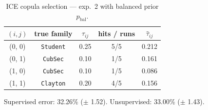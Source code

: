 \begin{table}[htbp]
  \centering
  \caption{ICE copula selection — exp.\ 2 with balanced prior $p_{\text{bal}}$.}
  \label{tab:exp3-exp2_bal_p}
  \begin{tabular}{ccccc}
    \toprule
    $(i, j)$ & true family & $\tau_{ij}$ & hits / runs & $\hat\tau_{ij}$ \\
    \midrule
    (0, 0) & \texttt{Student} & 0.25 & 5/5 & 0.212 \\
    (0, 1) & \texttt{CubSec} & 0.10 & 1/5 & 0.161 \\
    (1, 0) & \texttt{CubSec} & 0.10 & 1/5 & 0.086 \\
    (1, 1) & \texttt{Clayton} & 0.20 & 4/5 & 0.156 \\
    \bottomrule
  \end{tabular}
  \par\smallskip Supervised error: 32.26\% ($\pm$ 1.52). Unsupervised: 33.00\% ($\pm$ 1.43).
\end{table}
